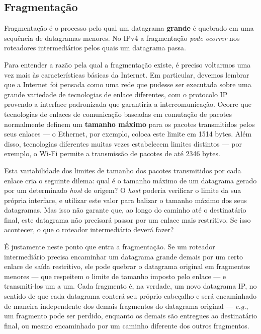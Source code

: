 \documentclass{article}
\begin{document}
\subsection{Fragmentação}

Fragmentação é o processo pelo qual um datagrama \textbf{grande} é quebrado em uma sequência de datagramas menores. No IPv4 a fragmentação \textit{pode ocorrer} nos roteadores intermediários pelos quais um datagrama passa.

Para entender a razão pela qual a fragmentação existe, é preciso voltarmos uma vez mais às características básicas da Internet. Em particular, devemos lembrar que a Internet foi pensada como uma rede que pudesse ser executada sobre uma grande variedade de tecnologias de enlace diferentes, com o protocolo IP provendo a interface padronizada que garantiria a intercomunicação. Ocorre que tecnologias de enlaces de comunicação baseadas em comutação de pacotes normalmente definem um \textbf{tamanho máximo} para os pacotes transmitidos pelos seus enlaces --- o Ethernet, por exemplo, coloca este limite em 1514 bytes. Além disso, tecnologias diferentes muitas vezes estabelecem limites distintos --- por exemplo, o Wi-Fi permite a transmissão de pacotes de até 2346 bytes.

Esta variabilidade dos limites de tamanho dos pacotes transmitidos por cada enlace cria o seguinte dilema: qual é o tamanho máximo de um datagrama gerado por um determinado \textit{host} de origem? O \textit{host} poderia verificar o limite da sua própria interface, e utilizar este valor para balizar o tamanho máximo dos seus datagramas. Mas isso não garante que, ao longo do caminho até o destinatário final, este datagrama não precisará passar por um enlace mais restritivo. Se isso acontecer, o que o roteador intermediário deverá fazer?

É justamente neste ponto que entra a fragmentação. Se um roteador intermediário precisa encaminhar um datagrama grande demais por um certo enlace de saída restritivo, ele pode quebrar o datagrama original em fragmentos menores --- que respeitem o limite de tamanho imposto pelo enlace --- e transmiti-los um a um. Cada fragmento é, na verdade, um novo datagrama IP, no sentido de que cada datagrama conterá seu próprio cabeçalho e será encaminhado de maneira independente dos demais fragmentos do datagrama original --- \textit{e.g.}, um fragmento pode ser perdido, enquanto os demais são entregues ao destinatário final, ou mesmo encaminhado por um caminho diferente dos outros fragmentos.
\end{document}
